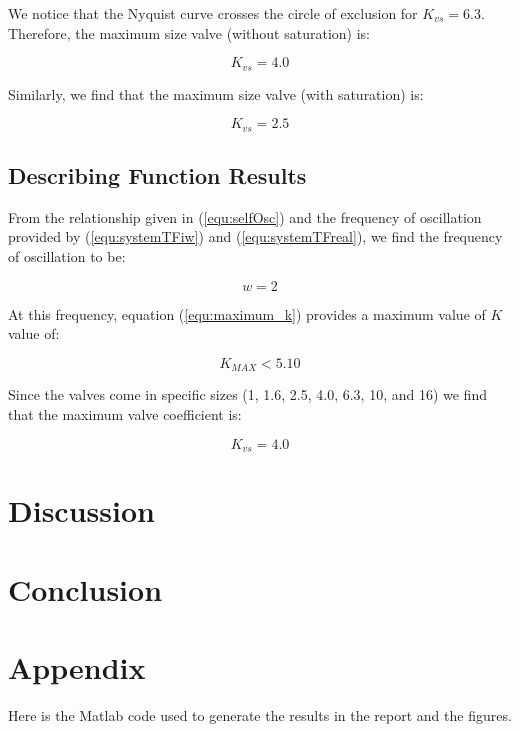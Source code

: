 \documentclass[a4paper, titlepage]{article}
\begin{document}
We notice that the Nyquist curve crosses the circle of exclusion for $K_{vs}=6.3$.  Therefore, the maximum size valve (without saturation) is:

\begin{equation}
K_{vs} = 4.0
\label{equ:k_max_wo_saturation}
\end{equation}

Similarly, we find that the maximum size valve (with saturation) is:

\begin{equation}
K_{vs} = 2.5
\label{equ:k_max_w_saturation}
\end{equation}

\subsection{Describing Function Results}

From the relationship given in (\ref{equ:selfOsc}) and the frequency of oscillation provided by (\ref{equ:systemTFiw}) and (\ref{equ:systemTFreal}), we find the frequency of oscillation to be:

\begin{equation}
w=2
\label{equ:omega_zero}
\end{equation}

At this frequency, equation (\ref{equ:maximum_k}) provides a maximum value of $K$ value of:

\begin{equation}
K_{MAX} < 5.10
\label{equ:k_valid}
\end{equation}

Since the valves come in specific sizes (1, 1.6, 2.5, 4.0, 6.3, 10, and 16) we find that the maximum valve coefficient is:

\begin{equation}
K_{vs} = 4.0
\label{equ:k_max}
\end{equation}


\section{Discussion}
\section{Conclusion}




\clearpage


\clearpage
\appendix

\section{Appendix}
Here is the Matlab code used to generate the results in the report and the figures.


\end{document}
